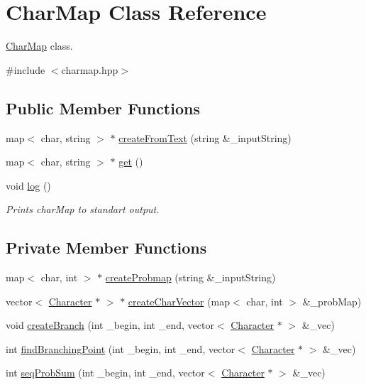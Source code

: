 \hypertarget{classCharMap}{}\section{Char\+Map Class Reference}
\label{classCharMap}


\hyperlink{classCharMap}{Char\+Map} class.  




{\ttfamily \#include $<$charmap.\+hpp$>$}

\subsection*{Public Member Functions}
\begin{DoxyCompactItemize}
\item 
map$<$ char, string $>$ $\ast$ \hyperlink{classCharMap_afded320bf55231b9a085e8debefcdb07}{create\+From\+Text} (string \&\+\_\+input\+String)
\item 
map$<$ char, string $>$ $\ast$ \hyperlink{classCharMap_ac524e3dded375fd05040a0136326d437}{get} ()
\item 
void \hyperlink{classCharMap_a27b231ec99c313ef2b60daa6f031bebe}{log} ()\hypertarget{classCharMap_a27b231ec99c313ef2b60daa6f031bebe}{}\label{classCharMap_a27b231ec99c313ef2b60daa6f031bebe}

\begin{DoxyCompactList}\small\item\em Prints char\+Map to standart output. \end{DoxyCompactList}\end{DoxyCompactItemize}
\subsection*{Private Member Functions}
\begin{DoxyCompactItemize}
\item 
map$<$ char, int $>$ $\ast$ \hyperlink{classCharMap_a779aa6c2c004ff748005d16e19e27c57}{create\+Probmap} (string \&\+\_\+input\+String)
\item 
vector$<$ \hyperlink{classCharacter}{Character} $\ast$ $>$ $\ast$ \hyperlink{classCharMap_ac4aadff0c6d56414f7ce4c228d9aad5e}{create\+Char\+Vector} (map$<$ char, int $>$ \&\+\_\+prob\+Map)
\item 
void \hyperlink{classCharMap_aee0b17ddb4641c641ab36f623ddc6017}{create\+Branch} (int \+\_\+begin, int \+\_\+end, vector$<$ \hyperlink{classCharacter}{Character} $\ast$ $>$ \&\+\_\+vec)
\item 
int \hyperlink{classCharMap_af79927e3bdb5c9927bac14dc0c0882f1}{find\+Branching\+Point} (int \+\_\+begin, int \+\_\+end, vector$<$ \hyperlink{classCharacter}{Character} $\ast$ $>$ \&\+\_\+vec)
\item 
int \hyperlink{classCharMap_a0984bcde61be7fa7b604aa650c0f0c49}{seq\+Prob\+Sum} (int \+\_\+begin, int \+\_\+end, vector$<$ \hyperlink{classCharacter}{Character} $\ast$ $>$ \&\+\_\+vec)
\end{DoxyCompactItemize}
